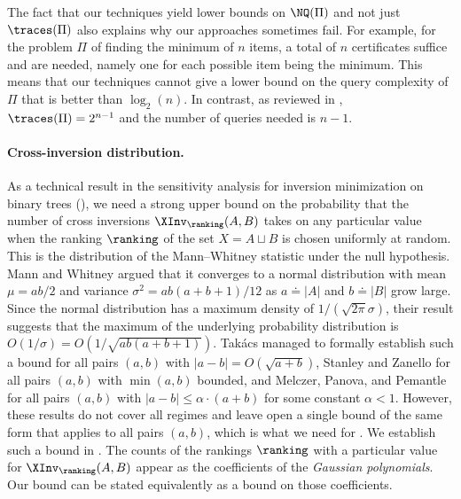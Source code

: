 \documentclass{toc}
\begin{document}
The fact that our techniques yield lower bounds on $\NQ(\Pi)$ and not just $\traces(\Pi)$ also explains why our approaches sometimes fail. For example, for the problem $\Pi$ of finding the minimum of $n$ items, a total of $n$ certificates suffice and are needed, namely one for each possible item being the minimum. This means that our techniques cannot give a lower bound on the query complexity of $\Pi$ that is better than $\log_2(n)$. In contrast, as reviewed in , $\traces(\Pi)=2^{n-1}$ and the number of queries needed is $n-1$. 

\paragraph{Cross-inversion distribution.}
As a technical result in the sensitivity analysis for inversion minimization on binary trees (), we need a strong upper bound on the probability that the number of cross inversions $\XInv_\ranking(A,B)$ takes on any particular value when the ranking $\ranking$ of the set $X = A \sqcup B$ is chosen uniformly at random. This is the distribution of the Mann--Whitney statistic under the null hypothesis. Mann and Whitney \cite{MannWhitney1947} argued that it converges to a normal distribution with mean $\mu=ab/2$ and variance $\sigma^2=ab(a+b+1)/12$ as $a \doteq |A|$ and $b \doteq |B|$ grow large. Since the normal distribution has a maximum density of $1/(\sqrt{2\pi}\sigma)$, their result suggests that the maximum of the underlying probability distribution is $O(1/\sigma)=O(1/\sqrt{ab(a+b+1)})$. Tak\'acs \cite{Takacs1986} managed to formally establish such a bound for all pairs $(a,b)$ with $|a-b|=O(\sqrt{a+b})$, Stanley and Zanello \cite{SZ15} for all pairs $(a,b)$ with $\min(a,b)$ bounded, and Melczer, Panova, and Pemantle \cite{MPP20} for all pairs $(a,b)$ with $|a-b|\le \alpha\cdot(a+b)$ for some constant $\alpha<1$. However, these results do not cover all regimes and leave open a single bound of the same form that applies to all pairs $(a,b)$, which is what we need for . We establish such a bound in . The counts of the rankings $\ranking$ with a particular value for $\XInv_\ranking(A,B)$ appear as the coefficients of the \emph{Gaussian polynomials}.
Our bound can be stated equivalently as a bound on those coefficients.
\end{document}
